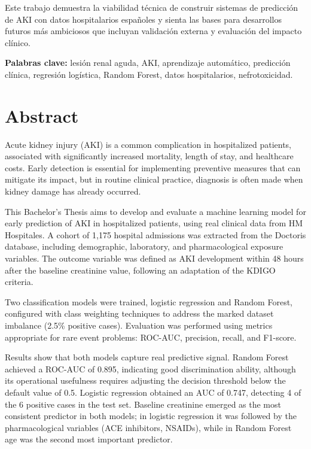\documentclass[12pt, a4paper, oneside]{report}
\begin{document}
Este trabajo demuestra la viabilidad técnica de construir sistemas de predicción de AKI con datos hospitalarios españoles y sienta las bases para desarrollos futuros más ambiciosos que incluyan validación externa y evaluación del impacto clínico.

\vspace{1cm}
\textbf{Palabras clave:} lesión renal aguda, AKI, aprendizaje automático, predicción clínica, regresión logística, Random Forest, datos hospitalarios, nefrotoxicidad.

\chapter*{Abstract}
Acute kidney injury (AKI) is a common complication in hospitalized patients, associated with significantly increased mortality, length of stay, and healthcare costs. Early detection is essential for implementing preventive measures that can mitigate its impact, but in routine clinical practice, diagnosis is often made when kidney damage has already occurred.

This Bachelor's Thesis aims to develop and evaluate a machine learning model for early prediction of AKI in hospitalized patients, using real clinical data from HM Hospitales. A cohort of 1,175 hospital admissions was extracted from the Doctoris database, including demographic, laboratory, and pharmacological exposure variables. The outcome variable was defined as AKI development within 48 hours after the baseline creatinine value, following an adaptation of the KDIGO criteria.

Two classification models were trained, logistic regression and Random Forest, configured with class weighting techniques to address the marked dataset imbalance (2.5\% positive cases). Evaluation was performed using metrics appropriate for rare event problems: ROC-AUC, precision, recall, and F1-score.

Results show that both models capture real predictive signal. Random Forest achieved a ROC-AUC of 0.895, indicating good discrimination ability, although its operational usefulness requires adjusting the decision threshold below the default value of 0.5. Logistic regression obtained an AUC of 0.747, detecting 4 of the 6 positive cases in the test set. Baseline creatinine emerged as the most consistent predictor in both models; in logistic regression it was followed by the pharmacological variables (ACE inhibitors, NSAIDs), while in Random Forest age was the second most important predictor.
\end{document}
